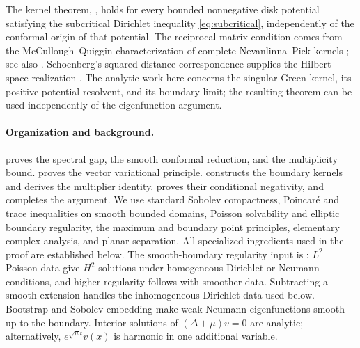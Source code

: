 The kernel theorem, , holds for every bounded nonnegative disk potential satisfying the subcritical Dirichlet inequality \eqref{eq:subcritical}, independently of the conformal origin of that potential. The reciprocal-matrix condition comes from the McCullough--Quiggin characterization of complete Nevanlinna--Pick kernels \cite{McCullough1992,McCullough1994,Quiggin1993,Quiggin1994}; see also \cite[Corollary~1.12]{AglerMcCarthy2000}. Schoenberg's squared-distance correspondence supplies the Hilbert-space realization \cite{Schoenberg1938}. The analytic work here concerns the singular Green kernel, its positive-potential resolvent, and its boundary limit; the resulting theorem can be used independently of the eigenfunction argument.

\paragraph{Organization and background.}
 proves the spectral gap, the smooth conformal reduction, and the multiplicity bound.  proves the vector variational principle.  constructs the boundary kernels and derives the multiplier identity.  proves their conditional negativity, and  completes the argument.
We use standard Sobolev compactness, Poincar\'e and trace inequalities on smooth bounded domains, Poisson solvability and elliptic boundary regularity, the maximum and boundary point principles, elementary complex analysis, and planar separation. All specialized ingredients used in the proof are established below. The smooth-boundary regularity input is \cite[Chapter~III, Theorems~6.1, 6.4 and~6.5]{Showalter1994}: $L^2$ Poisson data give $H^2$ solutions under homogeneous Dirichlet or Neumann conditions, and higher regularity follows with smoother data. Subtracting a smooth extension handles the inhomogeneous Dirichlet data used below. Bootstrap and Sobolev embedding make weak Neumann eigenfunctions smooth up to the boundary. Interior solutions of $(\Delta+\mu)v=0$ are analytic; alternatively, $e^{\sqrt\mu t}v(x)$ is harmonic in one additional variable.

